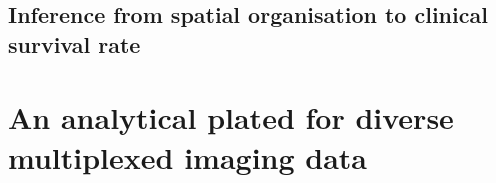 \subsection{Inference from spatial organisation to clinical survival rate}

\section{An analytical plated for diverse multiplexed imaging data}
\label{Sec:4.3_quantitative_validation}	%
\subsection{}

